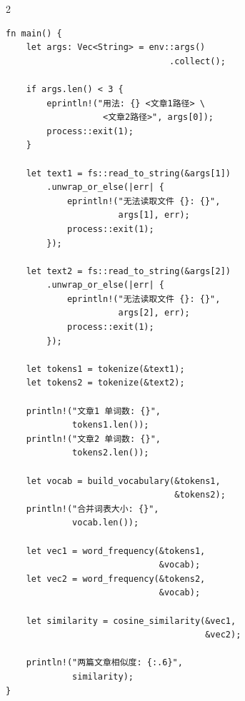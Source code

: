 {\begin{multicols}{2}
\begin{verbatim}
fn main() {
    let args: Vec<String> = env::args()
                                .collect();

    if args.len() < 3 {
        eprintln!("用法: {} <文章1路径> \
                   <文章2路径>", args[0]);
        process::exit(1);
    }

    let text1 = fs::read_to_string(&args[1])
        .unwrap_or_else(|err| {
            eprintln!("无法读取文件 {}: {}",
                      args[1], err);
            process::exit(1);
        });

    let text2 = fs::read_to_string(&args[2])
        .unwrap_or_else(|err| {
            eprintln!("无法读取文件 {}: {}",
                      args[2], err);
            process::exit(1);
        });

    let tokens1 = tokenize(&text1);
    let tokens2 = tokenize(&text2);

    println!("文章1 单词数: {}",
             tokens1.len());
    println!("文章2 单词数: {}",
             tokens2.len());

    let vocab = build_vocabulary(&tokens1,
                                 &tokens2);
    println!("合并词表大小: {}",
             vocab.len());

    let vec1 = word_frequency(&tokens1,
                              &vocab);
    let vec2 = word_frequency(&tokens2,
                              &vocab);

    let similarity = cosine_similarity(&vec1,
                                       &vec2);

    println!("两篇文章相似度: {:.6}",
             similarity);
}
\end{verbatim}

\end{multicols}
}
\vspace{0.5cm}
